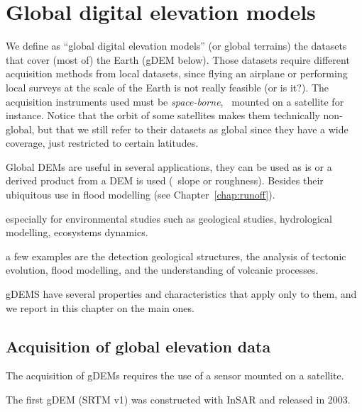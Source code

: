
\setchapterpreamble[u]{\margintoc}
\graphicspath{{gdem/figs/}}


\chapter{Global digital elevation models}%
\label{chap:gdem}

We define as ``global digital elevation models'' (or global terrains) the datasets that cover (most of) the Earth (gDEM below).%
Those datasets require different acquisition methods from local datasets, since flying an airplane or performing local surveys at the scale of the Earth is not really feasible (or is it?).
The acquisition instruments used must be \emph{space-borne}, \ie\ mounted on a satellite for instance.
Notice that the orbit of some satellites makes them technically non-global, but that we still refer to their datasets as global since they have a wide coverage, just restricted to certain latitudes.

Global DEMs are useful in several applications, they can be used as is or a derived product from a DEM is used (\eg\ slope or roughness).
Besides their ubiquitous use in flood modelling (see Chapter~\ref{chap:runoff}).

especially for environmental studies such as geological studies, hydrological modelling, ecosystems dynamics.

a few examples are the detection geological structures, the analysis of tectonic evolution, flood modelling, and the understanding of volcanic processes.


gDEMS have several properties and characteristics that apply only to them, and we report in this chapter on the main ones.



%
\section[Acquisition of global data]{Acquisition of global elevation data}

The acquisition of gDEMs requires the use of a sensor mounted on a satellite.

The first gDEM (SRTM v1) was constructed with InSAR and released in 2003. 

